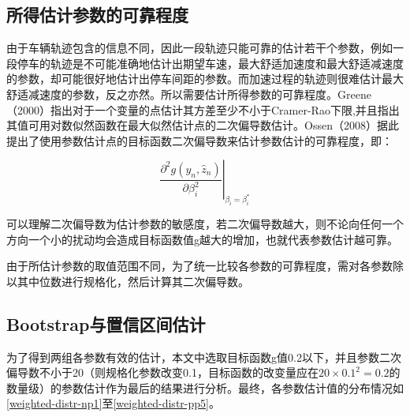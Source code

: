 \subsection{所得估计参数的可靠程度}

由于车辆轨迹包含的信息不同，因此一段轨迹只能可靠的估计若干个参数，例如一段停车的轨迹是不可能准确地估计出期望车速，最大舒适加速度和最大舒适减速度的参数，却可能很好地估计出停车间距的参数。而加速过程的轨迹则很难估计最大舒适减速度的参数，反之亦然。所以需要估计所得参数的可靠程度。Greene（2000）\cite{Greene2000}指出对于一个变量的点估计其方差至少不小于Cramer-Rao下限,并且指出其值可用对数似然函数在最大似然估计点的二次偏导数估计。Ossen（2008）\cite{Ossen2008}据此提出了使用参数估计点的目标函数二次偏导数来估计参数估计的可靠程度，即：

\begin{equation}
\left.\frac{\partial^2 g(y_n,\hat{z}_n)}{\partial\beta_i^2}\right| _{\beta_i=\beta_i^*}
\end{equation}

可以理解二次偏导数为估计参数的敏感度，若二次偏导数越大，则不论向任何一个方向一个小的扰动均会造成目标函数值g越大的增加，也就代表参数估计越可靠。

由于所估计参数的取值范围不同，为了统一比较各参数的可靠程度，需对各参数除以其中位数进行规格化，然后计算其二次偏导数。






\subsection{Bootstrap与置信区间估计}
为了得到两组各参数有效的估计，本文中选取目标函数g值0.2以下，并且参数二次偏导数不小于20（则规格化参数改变0.1，目标函数的改变量应在$20\times 0.1^2=0.2$的数量级）的参数估计作为最后的结果进行分析。最终，各参数估计值的分布情况如\autoref{weighted-distr-np1}至\autoref{weighted-distr-pp5}。


